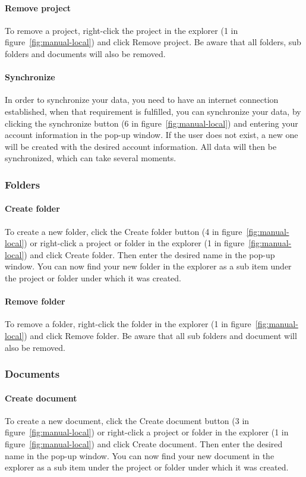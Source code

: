 	\paragraph{Remove project}
	To remove a project, right-click the project in the explorer (1 in figure~\ref{fig:manual-local}) and click Remove project. Be aware that all folders, sub folders and documents will also be removed.

	\paragraph{Synchronize}
	In order to synchronize your data, you need to have an internet connection established, when that requirement is fulfilled, you can synchronize your data, by clicking the synchronize button (6 in figure~\ref{fig:manual-local}) and entering your account information in the pop-up window. If the user does not exist, a new one will be created with the desired account information. All data will then be synchronized, which can take several moments.

\subsubsection{Folders}

	\paragraph{Create folder}
	To create a new folder, click the Create folder button (4 in figure~\ref{fig:manual-local}) or right-click a project or folder in the explorer (1 in figure~\ref{fig:manual-local}) and click Create folder. Then enter the desired name in the pop-up window. You can now find your new folder in the explorer as a sub item under the project or folder under which it was created.

	\paragraph{Remove folder}
	To remove a folder, right-click the folder in the explorer (1 in figure~\ref{fig:manual-local}) and click Remove folder. Be aware that all sub folders and document will also be removed.

\subsubsection{Documents}

	\paragraph{Create document}
	To create a new document, click the Create document button (3 in figure~\ref{fig:manual-local}) or right-click a project or folder in the explorer (1 in figure~\ref{fig:manual-local}) and click Create document. Then enter the desired name in the pop-up window. You can now find your new document in the explorer as a sub item under the project or folder under which it was created.
	

